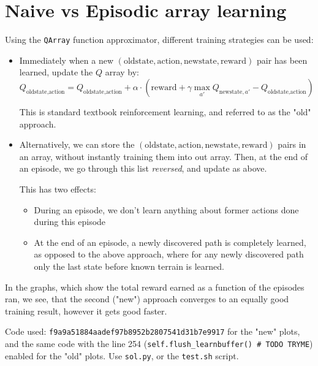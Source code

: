 \documentclass[ngerman]{scrartcl} %
\begin{document}
\section{Naive vs Episodic array learning}
Using the \verb+QArray+ function approximator, different training strategies can be used:

\begin{itemize}
\item Immediately when a new $(\text{oldstate}, \text{action}, \text{newstate}, \text{reward})$ pair has been learned,
	update the $Q$ array by:
	$$Q_{\text{oldstate},\text{action}} = Q_{\text{oldstate},\text{action}} + \alpha \cdot (\text{reward} + \gamma \max_{a'} Q_{\text{newstate},{a'}} - Q_{\text{oldstate},\text{action}})$$

	This is standard textbook reinforcement learning, and referred to as the "old" approach.

\item Alternatively, we can store the $(\text{oldstate}, \text{action}, \text{newstate}, \text{reward})$ pairs in an array,
	without instantly training them into out array. Then, at the end of an episode, we go through this list \emph{reversed}, and update as above.

	This has two effects:
	\begin{itemize}
	\item During an episode, we don't learn anything about former actions done during this episode
	\item At the end of an episode, a newly discovered path is completely learned, as opposed to the above approach, where for any newly discovered path only the last state before known terrain is learned.
	\end{itemize}
\end{itemize}

In the graphs, which show the total reward earned as a function of the episodes ran, we see, that the second ("new") approach converges to an equally good training result, however it gets good faster.



Code used: \verb+f9a9a51884aadef97b8952b2807541d31b7e9917+ for the "new" plots, and the same code with the line 254 (\verb+self.flush_learnbuffer() # TODO TRYME+) enabled for the "old" plots. Use \verb+sol.py+, or the \verb+test.sh+ script.
\end{document}
